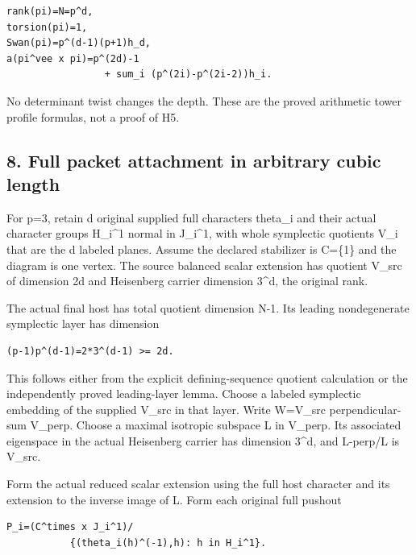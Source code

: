 \begin{Verbatim}[fontsize=\small,breaklines=true,breakanywhere=true]
rank(pi)=N=p^d,
torsion(pi)=1,
Swan(pi)=p^(d-1)(p+1)h_d,
a(pi^vee x pi)=p^(2d)-1
                 + sum_i (p^(2i)-p^(2i-2))h_i.
\end{Verbatim}

No determinant twist changes the depth. These are the proved arithmetic
tower profile formulas, not a proof of H5.

\hypertarget{odd_character-full-packet-attachment-in-arbitrary-cubic-length}{%
\subsection{8. Full packet attachment in arbitrary cubic
length}\label{odd_character-full-packet-attachment-in-arbitrary-cubic-length}}

For p=3, retain d original supplied full characters theta\_i and their
actual character groups H\_i\^{}1 normal in J\_i\^{}1, with whole
symplectic quotients V\_i that are the d labeled planes. Assume the
declared stabilizer is C=\{1\} and the diagram is one vertex. The source
balanced scalar extension has quotient V\_src of dimension 2d and
Heisenberg carrier dimension 3\^{}d, the original rank.

The actual final host has total quotient dimension N-1. Its leading
nondegenerate symplectic layer has dimension

\begin{Verbatim}[fontsize=\small,breaklines=true,breakanywhere=true]
(p-1)p^(d-1)=2*3^(d-1) >= 2d.
\end{Verbatim}

This follows either from the explicit defining-sequence quotient
calculation or the independently proved leading-layer lemma. Choose a
labeled symplectic embedding of the supplied V\_src in that layer.
Write W=V\_src perpendicular-sum V\_perp. Choose a maximal isotropic
subspace L in V\_perp. Its associated eigenspace in the actual
Heisenberg carrier has dimension 3\^{}d, and L-perp/L is V\_src.

Form the actual reduced scalar extension using the full host character
and its extension to the inverse image of L. Form each original full
pushout

\begin{Verbatim}[fontsize=\small,breaklines=true,breakanywhere=true]
P_i=(C^times x J_i^1)/
           {(theta_i(h)^(-1),h): h in H_i^1}.
\end{Verbatim}

